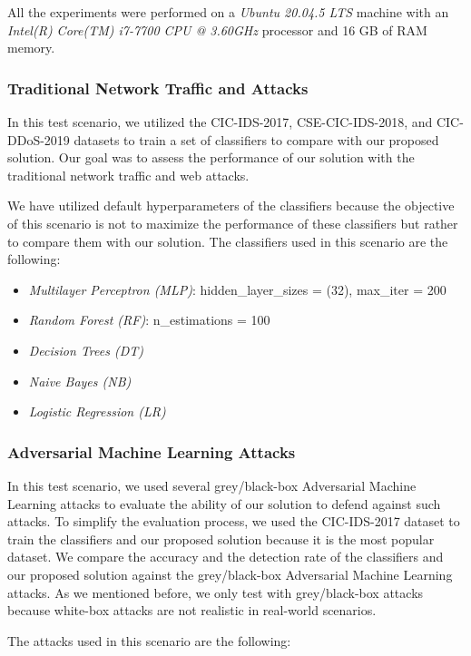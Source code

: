 All the experiments were performed on a \textit{Ubuntu 20.04.5 LTS} machine with an
\textit{Intel(R) Core(TM) i7-7700 CPU @ 3.60GHz} processor and 16 GB of RAM memory.


\subsubsection{Traditional Network Traffic and Attacks}
In this test scenario, we utilized the CIC-IDS-2017, CSE-CIC-IDS-2018, and CIC-DDoS-2019 datasets to train a set
of classifiers to compare with our proposed solution.
Our goal was to assess the performance of our solution with the traditional network traffic and web attacks.

We have utilized default hyperparameters of the classifiers because the objective of this scenario is not to
maximize the performance of these classifiers but rather to compare them with our solution.
The classifiers used in this scenario are the following:

\begin{itemize}
    \item \textit{Multilayer Perceptron (MLP)}: hidden\_layer\_sizes = (32), max\_iter = 200
    \item \textit{Random Forest (RF)}: n\_estimations = 100
    \item \textit{Decision Trees (DT)}
    \item \textit{Naive Bayes (NB)}
    \item \textit{Logistic Regression (LR)}
\end{itemize}

\subsubsection{Adversarial Machine Learning Attacks}

In this test scenario, we used several grey/black-box Adversarial Machine Learning attacks to evaluate the ability of
our solution to defend against such attacks.
To simplify the evaluation process, we used the CIC-IDS-2017 dataset to train the classifiers and our proposed solution
because it is the most popular dataset.
We compare the accuracy and the detection rate of the classifiers and our proposed solution against the grey/black-box
Adversarial Machine Learning attacks.
As we mentioned before, we only test with grey/black-box attacks because white-box attacks are not realistic in
real-world scenarios.

The attacks used in this scenario are the following:

